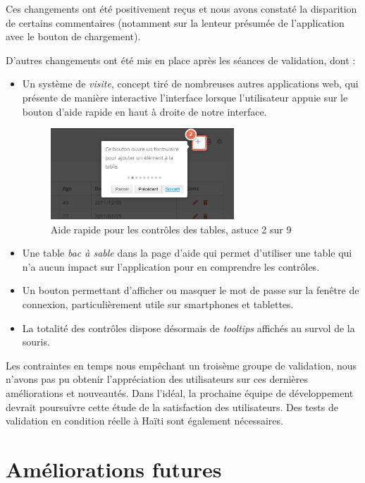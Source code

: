 \documentclass{EPL-master-thesis-covers-FR}
\begin{document}
				Ces changements ont été positivement reçus et nous avons constaté la disparition de certains commentaires (notamment sur la lenteur présumée de l'application avec le bouton de chargement).

				D'autres changements ont été mis en place après les séances de validation, dont :
				\begin{itemize}
					\item Un système de \emph{visite}, concept tiré de nombreuses autres applications web, qui présente de manière interactive l'interface lorsque l'utilisateur appuie sur le bouton d'aide rapide en haut à droite de notre interface.
						\begin{figure}[H]
							\centering
							\includegraphics[width=0.65\textwidth]{images/screen_sandbox_table_quick_help.png}
							\caption{Aide rapide pour les contrôles des tables, astuce 2 sur 9}
							\label{fig:screen_sandbox_quick_help}
						\end{figure}
					\item Une table \emph{bac à sable} dans la page d'aide qui permet d'utiliser une table qui n'a aucun impact sur l'application pour en comprendre les contrôles.
					\item Un bouton permettant d'afficher ou masquer le mot de passe sur la fenêtre de connexion, particulièrement utile sur smartphones et tablettes.
					\item La totalité des contrôles dispose désormais de \emph{tooltips} affichés au survol de la souris.
				\end{itemize}

				Les contraintes en temps nous empêchant un troisème groupe de validation, nous n'avons pas pu obtenir l'appréciation des utilisateurs sur ces dernières améliorations et nouveautés. Dans l'idéal, la prochaine équipe de développement devrait poursuivre cette étude de la satisfaction des utilisateurs. Des tests de validation en condition réelle à Haïti sont également nécessaires.

	\chapter{Améliorations futures}
\end{document}
